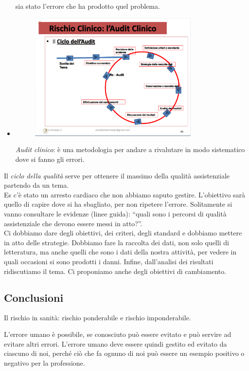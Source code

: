 \begin{itemize}
  sia stato l'errore che ha prodotto quel problema.
\item
\begin{figure}[!ht]
\centering
	\includegraphics[width=0.8\textwidth]{30/image5.png}
	\end{figure}
  
  \emph{Audit
  clinico}: è una metodologia per andare a rivalutare in modo
  sistematico dove si fanno gli errori.
\end{itemize}

Il \emph{ciclo della qualità} serve per ottenere il massimo della
qualità assistenziale partendo da un tema.\\
Es c'è stato un arresto cardiaco che non abbiamo saputo gestire.
L'obiettivo sarà quello di capire dove si ha sbagliato, per non ripetere
l'errore. Solitamente si vanno consultare le evidenze (linee guida):
``quali sono i percorsi di qualità assistenziale che devono essere messi
in atto?''.\\
Ci dobbiamo dare degli obiettivi, dei criteri, degli standard e dobbiamo
mettere in atto delle strategie. Dobbiamo fare la raccolta dei dati, non
solo quelli di letteratura, ma anche quelli che sono i dati della nostra
attività, per vedere in quali occasioni si sono prodotti i danni.
Infine, dall'analisi dei risultati ridiscutiamo il tema. Ci proponiamo
anche degli obiettivi di cambiamento.

\subsection{Conclusioni}

Il rischio in sanità: rischio ponderabile e rischio imponderabile.

L'errore umano è possibile, se conosciuto può essere evitato e può
servire ad evitare altri errori. L'errore umano deve essere quindi
gestito ed evitato da ciascuno di noi, perché ciò che fa ognuno di noi
può essere un esempio positivo o negativo per la professione.

